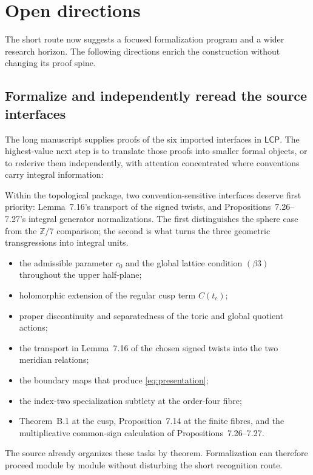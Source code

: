 \documentclass[11pt,reqno]{amsart}
\numberwithin{equation}{section}
\newcommand{\Z}{\mathbb Z}
\newcommand{\LCP}{\mathsf{LCP}}
\theoremstyle{definition}
\begin{document}
\section{Open directions}\label{sec:open}

The short route now suggests a focused formalization program and a wider research horizon. The following directions enrich the construction without changing its proof spine.

\subsection{Formalize and independently reread the source interfaces}

The long manuscript supplies proofs of the six imported interfaces in $\LCP$. The highest-value next step is to translate those proofs into smaller formal objects, or to rederive them independently, with attention concentrated where conventions carry integral information:

Within the topological package, two convention-sensitive interfaces deserve first priority: Lemma~7.16's transport of the signed twists, and Propositions~7.26--7.27's integral generator normalizations. The first distinguishes the sphere case from the $\Z/7$ comparison; the second is what turns the three geometric transgressions into integral units.
\begin{itemize}
\item the admissible parameter $c_0$ and the global lattice condition $(\beta3)$ throughout the upper half-plane;
\item holomorphic extension of the regular cusp term $C(t_c)$;
\item proper discontinuity and separatedness of the toric and global quotient actions;
\item the transport in Lemma~7.16 of the chosen signed twists into the two meridian relations;
\item the boundary maps that produce \cref{eq:presentation};
\item the index-two specialization subtlety at the order-four fibre;
\item Theorem~B.1 at the cusp, Proposition~7.14 at the finite fibres, and the multiplicative common-sign calculation of Propositions~7.26--7.27.
\end{itemize}
The source already organizes these tasks by theorem. Formalization can therefore proceed module by module without disturbing the short recognition route.
\end{document}
